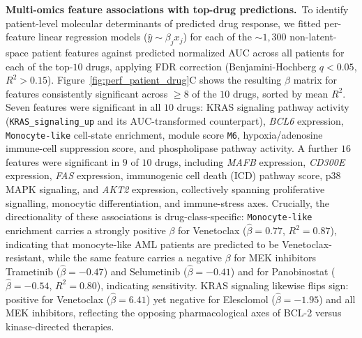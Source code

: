 \documentclass[pdflatex,sn-mathphys-num]{sn-jnl}
\theoremstyle{thmstyleone}
\theoremstyle{thmstyletwo}
\theoremstyle{thmstylethree}
\begin{document}
\noindent\textbf{Multi-omics feature associations with top-drug predictions.}~To identify patient-level molecular determinants of predicted drug response, we fitted per-feature linear regression models ($\hat{y} \sim \beta_j x_j$) for each of the $\sim\!1{,}300$ non-latent-space patient features against predicted normalized AUC across all patients for each of the top-$10$ drugs, applying FDR correction (Benjamini-Hochberg $q < 0.05$, $R^2 > 0.15$). Figure~\ref{fig:perf_patient_drug}C shows the resulting $\beta$ matrix for features consistently significant across $\geq\!8$ of the $10$ drugs, sorted by mean $R^2$. Seven features were significant in all $10$ drugs: KRAS signaling pathway activity (\texttt{KRAS\_signaling\_up} and its AUC-transformed counterpart), \textit{BCL6} expression, \texttt{Monocyte-like} cell-state enrichment, module score \texttt{M6}, hypoxia/adenosine immune-cell suppression score, and phospholipase pathway activity. A further $16$ features were significant in $9$ of $10$ drugs, including \textit{MAFB} expression, \textit{CD300E} expression, \textit{FAS} expression, immunogenic cell death (ICD) pathway score, p38 MAPK signaling, and \textit{AKT2} expression, collectively spanning proliferative signalling, monocytic differentiation, and immune-stress axes. Crucially, the directionality of these associations is drug-class-specific: \texttt{Monocyte-like} enrichment carries a strongly positive $\beta$ for Venetoclax ($\hat{\beta} = 0.77$, $R^2 = 0.87$), indicating that monocyte-like AML patients are predicted to be Venetoclax-resistant, while the same feature carries a negative $\beta$ for MEK inhibitors Trametinib ($\hat{\beta} = -0.47$) and Selumetinib ($\hat{\beta} = -0.41$) and for Panobinostat ($\hat{\beta} = -0.54$, $R^2 = 0.80$), indicating sensitivity. KRAS signaling likewise flips sign: positive for Venetoclax ($\hat{\beta} = 6.41$) yet negative for Elesclomol ($\hat{\beta} = -1.95$) and all MEK inhibitors, reflecting the opposing pharmacological axes of BCL-2 versus kinase-directed therapies.
\end{document}
